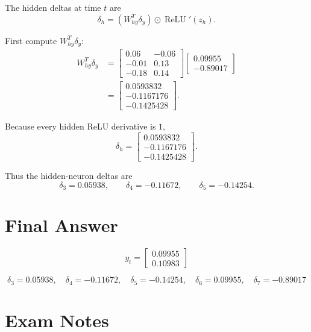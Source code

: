 \documentclass[11pt]{article}
\begin{document}
The hidden deltas at time \(t\) are
\[
    \delta_h
    =
    \left(W_{hy}^T\delta_y\right)\odot \operatorname{ReLU}'(z_h).
\]

First compute \(W_{hy}^T\delta_y\):
\[
\begin{aligned}
    W_{hy}^T\delta_y
    &=
    \begin{bmatrix}
        0.06 & -0.06 \\
        -0.01 & 0.13 \\
        -0.18 & 0.14
    \end{bmatrix}
    \begin{bmatrix}
        0.09955 \\
        -0.89017
    \end{bmatrix} \\
    &=
    \begin{bmatrix}
        0.0593832 \\
        -0.1167176 \\
        -0.1425428
    \end{bmatrix}.
\end{aligned}
\]

Because every hidden ReLU derivative is \(1\),
\[
    \delta_h
    =
    \begin{bmatrix}
        0.0593832 \\
        -0.1167176 \\
        -0.1425428
    \end{bmatrix}.
\]

Thus the hidden-neuron deltas are
\[
    \boxed{
    \delta_3=0.05938,\qquad
    \delta_4=-0.11672,\qquad
    \delta_5=-0.14254
    }.
\]

\section*{Final Answer}

\[
    \boxed{
    y_t=
    \begin{bmatrix}
        0.09955 \\
        0.10983
    \end{bmatrix}
    }
\]

\[
    \boxed{
    \delta_3=0.05938,\quad
    \delta_4=-0.11672,\quad
    \delta_5=-0.14254,\quad
    \delta_6=0.09955,\quad
    \delta_7=-0.89017
    }
\]

\section*{Exam Notes}
\end{document}
